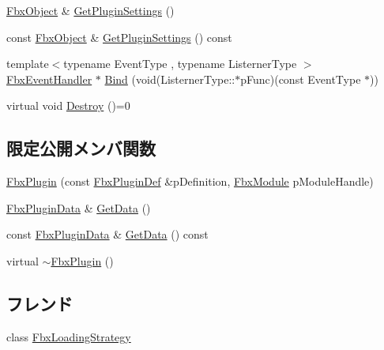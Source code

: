 \begin{DoxyCompactItemize}
\item 
\hyperlink{class_fbx_object}{Fbx\+Object} \& \hyperlink{class_fbx_plugin_aae9cc7178878f2350538b74e183f46cb}{Get\+Plugin\+Settings} ()
\item 
const \hyperlink{class_fbx_object}{Fbx\+Object} \& \hyperlink{class_fbx_plugin_a3f5e6d9e20e306ceee8f163bbf59fe58}{Get\+Plugin\+Settings} () const
\item 
{\footnotesize template$<$typename Event\+Type , typename Listerner\+Type $>$ }\\\hyperlink{class_fbx_event_handler}{Fbx\+Event\+Handler} $\ast$ \hyperlink{class_fbx_plugin_aafd653e6999de489d8e1c00fa9956ed0}{Bind} (void(Listerner\+Type\+::$\ast$p\+Func)(const Event\+Type $\ast$))
\item 
virtual void \hyperlink{class_fbx_plugin_a0a3b33c932cc862e539cef85d168b86a}{Destroy} ()=0
\end{DoxyCompactItemize}
\subsection*{限定公開メンバ関数}
\begin{DoxyCompactItemize}
\item 
\hyperlink{class_fbx_plugin_ab9ee11bcfcbc81e8fa9696f113e03181}{Fbx\+Plugin} (const \hyperlink{struct_fbx_plugin_def}{Fbx\+Plugin\+Def} \&p\+Definition, \hyperlink{fbxmodule_8h_a1d2ed3e9ccb8075d585f7cb7bdf40420}{Fbx\+Module} p\+Module\+Handle)
\item 
\hyperlink{struct_fbx_plugin_data}{Fbx\+Plugin\+Data} \& \hyperlink{class_fbx_plugin_a2bcee62f35bb9ccaf60dddaa2bd42ed9}{Get\+Data} ()
\item 
const \hyperlink{struct_fbx_plugin_data}{Fbx\+Plugin\+Data} \& \hyperlink{class_fbx_plugin_aa35c615aa2b4b740ae01e6301503c844}{Get\+Data} () const
\item 
virtual \hyperlink{class_fbx_plugin_ae1d45c36d20e8174fdfe3985a9e0e2d3}{$\sim$\+Fbx\+Plugin} ()
\end{DoxyCompactItemize}
\subsection*{フレンド}
\begin{DoxyCompactItemize}
\item 
class \hyperlink{class_fbx_plugin_a0e95beb1c4d5b2d326640c0ec8e9fbed}{Fbx\+Loading\+Strategy}
\end{DoxyCompactItemize}


